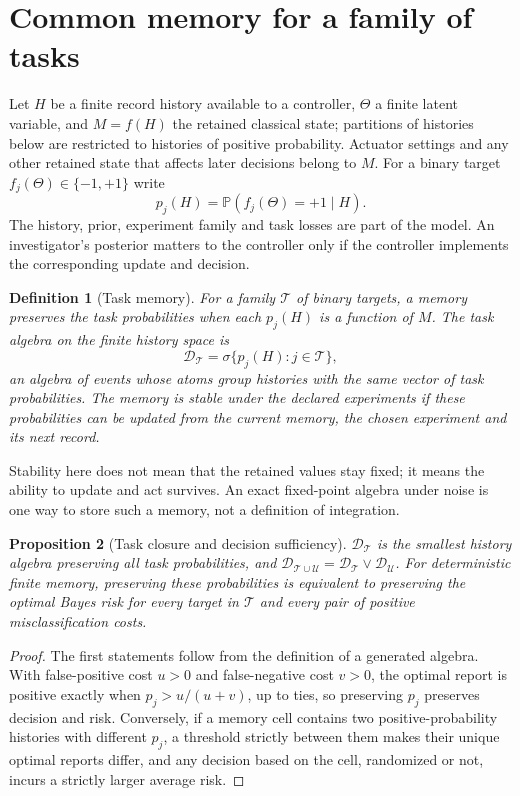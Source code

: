 \documentclass[11pt,a4paper]{article}
\newtheorem{definition}{Definition}[section]
\newtheorem{proposition}[definition]{Proposition}
\newcommand{\Pp}{\mathbb P}
\begin{document}
\section{Common memory for a family of tasks}\label{sec:memory}

Let $H$ be a finite record history available to a controller, $\Theta$ a finite latent variable, and $M=f(H)$ the retained classical state; partitions of histories below are restricted to histories of positive probability. Actuator settings and any other retained state that affects later decisions belong to $M$. For a binary target $f_j(\Theta)\in\{-1,+1\}$ write
\[
 p_j(H)=\Pp(f_j(\Theta)=+1\mid H).
\]
The history, prior, experiment family and task losses are part of the model. An investigator's posterior matters to the controller only if the controller implements the corresponding update and decision.

\begin{definition}[Task memory]
For a family $\mathcal T$ of binary targets, a memory preserves the task probabilities when each $p_j(H)$ is a function of $M$. The task algebra on the finite history space is
\begin{equation}\label{eq:taskalgebra}
 \mathscr D_{\mathcal T}=\sigma\{p_j(H):j\in\mathcal T\},
\end{equation}
an algebra of events whose atoms group histories with the same vector of task probabilities. The memory is stable under the declared experiments if these probabilities can be updated from the current memory, the chosen experiment and its next record.
\end{definition}

Stability here does not mean that the retained values stay fixed; it means the ability to update and act survives. An exact fixed-point algebra under noise is one way to store such a memory, not a definition of integration.

\begin{proposition}[Task closure and decision sufficiency]\label{prop:sufficiency}
$\mathscr D_{\mathcal T}$ is the smallest history algebra preserving all task probabilities, and $\mathscr D_{\mathcal T\cup\mathcal U}=\mathscr D_{\mathcal T}\vee\mathscr D_{\mathcal U}$. For deterministic finite memory, preserving these probabilities is equivalent to preserving the optimal Bayes risk for every target in $\mathcal T$ and every pair of positive misclassification costs.
\end{proposition}
\begin{proof}
The first statements follow from the definition of a generated algebra. With false-positive cost $u>0$ and false-negative cost $v>0$, the optimal report is positive exactly when $p_j>u/(u+v)$, up to ties, so preserving $p_j$ preserves decision and risk. Conversely, if a memory cell contains two positive-probability histories with different $p_j$, a threshold strictly between them makes their unique optimal reports differ, and any decision based on the cell, randomized or not, incurs a strictly larger average risk.
\end{proof}
\end{document}
